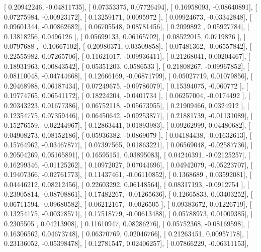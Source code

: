 \documentclass{article}
\begin{document}
       [ 0.20942246, -0.04811735],
       [ 0.07353375,  0.07726494],
       [ 0.16958093, -0.08640891],
       [ 0.07275984, -0.00923172],
       [ 0.13259171,  0.0095972 ],
       [ 0.09924673, -0.03342848],
       [ 0.09601344, -0.00862682],
       [ 0.06705548,  0.08781456],
       [ 0.2099892 ,  0.05927784],
       [ 0.13818256,  0.0496126 ],
       [ 0.05699133,  0.06165702],
       [ 0.08522015,  0.0719826 ],
       [ 0.0797688 , -0.10667102],
       [ 0.20980371,  0.03509858],
       [ 0.07481362, -0.06557842],
       [ 0.22555982,  0.07265706],
       [ 0.11621017, -0.09936411],
       [ 0.21268041,  0.00204467],
       [ 0.18931963,  0.00843542],
       [ 0.05351203,  0.0586533 ],
       [ 0.21808267, -0.09967852],
       [ 0.08110048, -0.04744668],
       [ 0.12666169, -0.06871799],
       [ 0.05027719,  0.01079856],
       [ 0.20468988,  0.06187434],
       [ 0.07249675, -0.09786079],
       [ 0.15394075, -0.060772  ],
       [ 0.19774765,  0.06541172],
       [ 0.18224204, -0.0401734 ],
       [ 0.06257004, -0.0174492 ],
       [ 0.20343223,  0.01677386],
       [ 0.06752118, -0.05673955],
       [ 0.21909466,  0.0324912 ],
       [ 0.12354775,  0.07359446],
       [ 0.06450642, -0.09253877],
       [ 0.21881739, -0.01131089],
       [ 0.15276559, -0.02244967],
       [ 0.12863441,  0.01893983],
       [ 0.09262999,  0.04480682],
       [ 0.04908273,  0.08152186],
       [ 0.05936382, -0.0869079 ],
       [ 0.04184438, -0.01632613],
       [ 0.15764962, -0.03467877],
       [ 0.07397565,  0.01863221],
       [ 0.06569048, -0.02587736],
       [ 0.20504269,  0.05165891],
       [ 0.16595151,  0.03895083],
       [ 0.04246391, -0.02125257],
       [ 0.16299346, -0.01125262],
       [ 0.10972027,  0.07044696],
       [ 0.04942079, -0.05223707],
       [ 0.19407366, -0.02761773],
       [ 0.11437461, -0.06110852],
       [ 0.1368689 ,  0.03592081],
       [ 0.04446212,  0.08212456],
       [ 0.22603292,  0.06148564],
       [ 0.08317193, -0.0912754 ],
       [ 0.23905814, -0.08708861],
       [ 0.17482267, -0.01265636],
       [ 0.12665833,  0.03403252],
       [ 0.06711594, -0.09680582],
       [ 0.06212167, -0.0026505 ],
       [ 0.09383672,  0.01226719],
       [ 0.13254175, -0.00378571],
       [ 0.17518779, -0.00613488],
       [ 0.05788973,  0.01009385],
       [ 0.2305505 ,  0.04213908],
       [ 0.11610947,  0.08286276],
       [ 0.05752368, -0.08169598],
       [ 0.16306562,  0.04673748],
       [ 0.06370769,  0.02046766],
       [ 0.21263451,  0.00957178],
       [ 0.23136052, -0.05398478],
       [ 0.12781547,  0.02406257],
       [ 0.07866229, -0.06311153],
\end{document}
